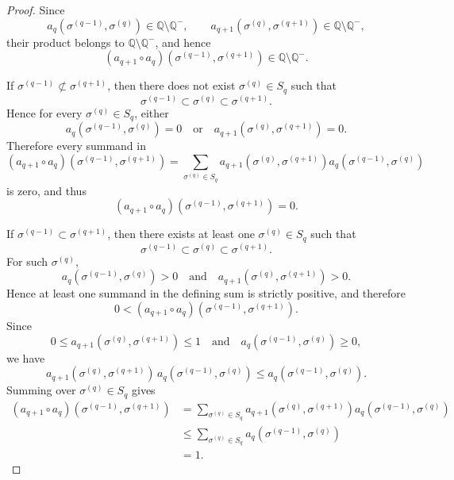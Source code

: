 \documentclass[12pt]{article}
\theoremstyle{normalhead_nobrackets}
\theoremstyle{exampstyle}
\begin{document}
\begin{proof}

Since
\[
a_q(\sigma^{(q-1)}, \sigma^{(q)}) 
\in \mathbb{Q} \setminus \mathbb{Q}^-,
\qquad
a_{q+1}(\sigma^{(q)}, \sigma^{(q+1)}) 
\in \mathbb{Q} \setminus \mathbb{Q}^-,
\]
their product belongs to $\mathbb{Q} \setminus \mathbb{Q}^-$, and hence
\[
(a_{q+1} \circ a_q)(\sigma^{(q-1)}, \sigma^{(q+1)})
\in \mathbb{Q} \setminus \mathbb{Q}^-.
\]

\medskip

\noindent
{}
If $\sigma^{(q-1)} \not\subset \sigma^{(q+1)}$, then there does not exist 
$\sigma^{(q)} \in S_q$ such that
\[
\sigma^{(q-1)} \subset \sigma^{(q)} 
\subset \sigma^{(q+1)}.
\]
Hence for every $\sigma^{(q)} \in S_q$, either
\[
a_q(\sigma^{(q-1)}, \sigma^{(q)}) = 0
\quad \text{or} \quad
a_{q+1}(\sigma^{(q)}, \sigma^{(q+1)}) = 0.
\]
Therefore every summand in
\[
(a_{q+1} \circ a_q)(\sigma^{(q-1)}, \sigma^{(q+1)})
=
\sum_{\sigma^{(q)} \in S_q}
a_{q+1}(\sigma^{(q)}, \sigma^{(q+1)})
a_q(\sigma^{(q-1)}, \sigma^{(q)})
\]
is zero, and thus
\[
(a_{q+1} \circ a_q)(\sigma^{(q-1)}, \sigma^{(q+1)}) = 0.
\]

\medskip

\noindent
{}
If $\sigma^{(q-1)} \subset \sigma^{(q+1)}$, then there exists at least one 
$\sigma^{(q)} \in S_q$ such that
\[
\sigma^{(q-1)} \subset \sigma^{(q)} 
\subset \sigma^{(q+1)}.
\]
For such $\sigma^{(q)}$,
\[
a_q(\sigma^{(q-1)}, \sigma^{(q)}) > 0
\quad \text{and} \quad
a_{q+1}(\sigma^{(q)}, \sigma^{(q+1)}) > 0.
\]
Hence at least one summand in the defining sum is strictly positive,
and therefore
\[
0 < (a_{q+1} \circ a_q)(\sigma^{(q-1)}, \sigma^{(q+1)}).
\]
Since 
\[
0 \le a_{q+1}(\sigma^{(q)}, \sigma^{(q+1)}) \le 1
\quad \text{and} \quad
a_q(\sigma^{(q-1)}, \sigma^{(q)}) \ge 0,
\]
we have
\[
a_{q+1}(\sigma^{(q)}, \sigma^{(q+1)})
\, a_q(\sigma^{(q-1)}, \sigma^{(q)})
\le
a_q(\sigma^{(q-1)}, \sigma^{(q)}).
\]
Summing over $\sigma^{(q)} \in S_q$ gives
\begin{align*}
(a_{q+1} \circ a_q)(\sigma^{(q-1)}, \sigma^{(q+1)})
&=
\sum_{\sigma^{(q)} \in S_q}
a_{q+1}(\sigma^{(q)}, \sigma^{(q+1)})
a_q(\sigma^{(q-1)}, \sigma^{(q)}) \\
&\le
\sum_{\sigma^{(q)} \in S_q}
a_q(\sigma^{(q-1)}, \sigma^{(q)}) \\
&= 1.
\end{align*}

\medskip


\end{proof}
\end{document}

